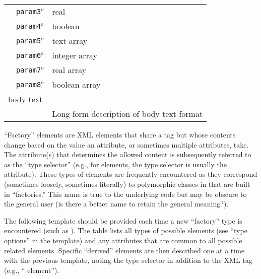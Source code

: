 \begin{table}[h]
\begin{center}
\begin{tabularx}{\textwidth}{l l l l l X }
   &   \texttt{param3}$^o$&  real              &                  &                     &                       \\
   &   \texttt{param4}$^o$&  boolean           &                  &                     &                       \\
   &   \texttt{param5}$^o$&  text array        &                  &                     &                       \\
   &   \texttt{param6}$^o$&  integer array     &                  &                     &                       \\
   &   \texttt{param7}$^o$&  real array        &                  &                     &                       \\
   &   \texttt{param8}$^o$&  boolean array     &                  &                     &                       \\
\multicolumn{2}{l}{body text}  & \multicolumn{4}{l}{}\\
   &                           & \multicolumn{4}{l}{Long form description of body text format}                   \\
  \hline
\end{tabularx}
\end{center}
\end{table}
\FloatBarrier



``Factory'' elements are XML elements that share a tag but whose contents change based on the value an attribute, or sometimes multiple attributes, take.  The attribute(s) that determines the allowed content is subsequently referred to as the ``type selector''  (e.g., for  elements, the type selector is usually the  attribute).  These types of elements are frequently encountered as they correspond (sometimes loosely, sometimes literally) to polymorphic classes in \qmcpack that are built in ``factories.''  This name is true to the underlying code but may be obscure to the general user (is there a better name to retain the general meaning?).   

The following template should be provided each time a new ``factory'' type is encountered (such as ).  The table lists all types of possible elements (see ``type options'' in the template) and any attributes that are common to all possible related elements.  Specific ``derived'' elements are then described one at a time with the previous template, noting the type selector in addition to the XML tag (e.g., `` element'').

